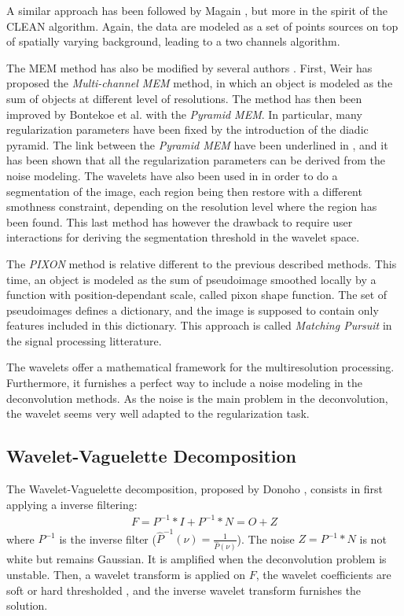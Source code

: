 \documentclass[11pt,a4paper]{article}
\begin{document}
A similar approach has been followed by Magain \cite{rest:magain98}, but
more in the spirit of the CLEAN algorithm. Again, the data are modeled as a 
set of points sources on top of spatially varying background, leading
to a two channels algorithm.

The MEM method has also be modified by several authors 
\cite{entropy:weir92,entropy:bontekoe94,starck:pan96,entropy:nunez98,starck:sta01_1}.
First, Weir has proposed the {\em Multi-channel MEM} method, in which an 
object is modeled as the sum of objects at different level of resolutions.
The method has then been improved by   
Bontekoe et al. \cite{entropy:bontekoe94} with the {\em Pyramid MEM}. 
In particular, many regularization parameters have been fixed by the
introduction of the diadic pyramid. The link between the {\em Pyramid MEM} 
have been underlined in \cite{starck:pan96,starck:sta01_1}, and it has been
shown that all the regularization parameters can be derived from the noise
modeling. The wavelets have also been used in \cite{entropy:nunez98} in 
order to do a segmentation of the image, each region being then restore
with a different smothness constraint, depending on the resolution level
where the region has been found. This last method has however the drawback
to require user interactions for deriving the segmentation
threshold in the wavelet space.

The {\em PIXON} method \cite{rest:dixon96,rest:puetter99}
is relative different to the previous described methods. This time, an object
is modeled as the sum of pseudoimage smoothed locally by a function with 
position-dependant scale, called pixon shape function. 
The set of pseudoimages defines a dictionary, and the image is supposed to
contain only features included in this dictionary. This approach is
called {\em Matching Pursuit} \cite{wave:mallat93,ima:mallat98} 
in the signal processing litterature. 

The wavelets offer a mathematical framework for the 
multiresolution processing. Furthermore, it furnishes a perfect way
to include a noise modeling in the deconvolution methods. As the noise
is the main problem in the deconvolution, the wavelet seems very well
adapted to the regularization task.  


\subsection{Wavelet-Vaguelette Decomposition}
The Wavelet-Vaguelette decomposition, proposed by Donoho \cite{rest:donoho95b},
consists in first applying a inverse filtering:
\begin{eqnarray}
 F = P^{-1} * I  +  P^{-1} * N = O + Z
\end{eqnarray}
where $P^{-1}$ is the inverse filter 
($\hat{P}^{-1}(\nu) = \frac{1}{\hat{P}(\nu)}$). 
The noise $Z =  P^{-1} * N$ is not white but remains 
Gaussian. It is amplified when the deconvolution
problem is unstable. 
Then, a wavelet transform is applied on $F$, the wavelet coefficients
are soft or hard thresholded \cite{rest:donoho93_2}, 
and the inverse wavelet transform 
furnishes the solution. 
\end{document}
